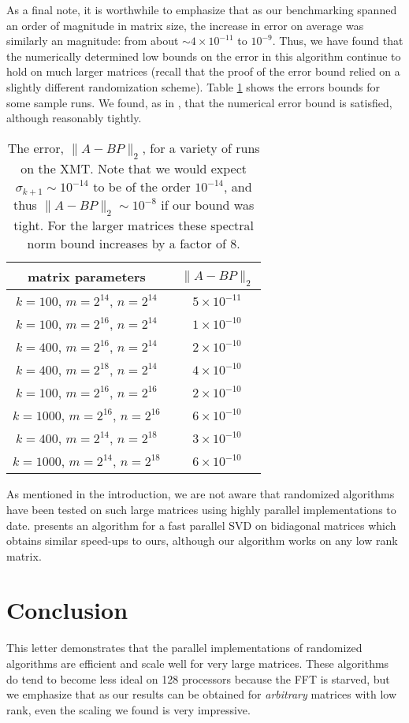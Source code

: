 \documentclass[11pt]{article}
\begin{document}
As a final note, it is worthwhile to emphasize that as our benchmarking spanned an order of magnitude in matrix size, the increase in error on average was similarly an magnitude: from about $\sim 4\times 10^{-11}$ to $10^{-9}$.  Thus, we have found that the numerically determined low bounds on the error in this algorithm continue to hold on much larger matrices (recall that the proof of the error bound relied on a slightly different randomization scheme).  Table \ref{ertab} shows the errors bounds for some sample runs.  We found, as in \cite{rokpnas}, that the numerical error bound is satisfied, although reasonably tightly.  
\begin{table}[here]
\centering
\begin{tabular}{|c|c|}\hline
matrix parameters &\ $\| A-BP\|_2$ \\ \hline
$k=100$, $m=2^{14}$, $n=2^{14}$ &\ $5\times 10^{-11}$ \\
$k=100$, $m=2^{16}$, $n=2^{14}$ &\ $1\times 10^{-10}$ \\
$k=400$, $m=2^{16}$, $n=2^{14}$ &\ $2\times 10^{-10}$ \\
$k=400$, $m=2^{18}$, $n=2^{14}$ &\ $4\times 10^{-10}$ \\
$k=100$, $m=2^{16}$, $n=2^{16}$ &\ $2\times 10^{-10}$ \\
$k=1000$, $m=2^{16}$, $n=2^{16}$ &\ $6\times 10^{-10}$ \\
$k=400$, $m=2^{14}$, $n=2^{18}$ &\ $3\times 10^{-10}$ \\
$k=1000$, $m=2^{14}$, $n=2^{18}$ &\ $6\times 10^{-10}$ \\ \hline
\end{tabular}
\caption{The error, $\| A-BP\|_2$, for a variety of runs on the XMT.  Note that we would expect $\sigma_{k+1} \sim 10^{-14}$ to be of the order $10^{-14}$, and thus $\| A-BP\|_2 \sim 10^{-8}$ if our bound was tight.  For the larger matrices these spectral norm bound increases by a  factor of 8.}
\label{ertab}
\end{table}

As mentioned in the introduction, we are not aware that randomized algorithms have been tested on such large matrices using highly parallel implementations to date.   \cite{konda} presents an algorithm for a fast parallel SVD on bidiagonal matrices which obtains similar speed-ups to ours, although our algorithm works on any low rank matrix.

\section{Conclusion}
This letter demonstrates that the parallel implementations of randomized algorithms are efficient and scale well for very large matrices.  These algorithms do tend to become less ideal on 128 processors because the FFT is starved, but we emphasize that as our results can be obtained for \emph{arbitrary} matrices with low rank, even the scaling we found is very impressive.  
\end{document}
